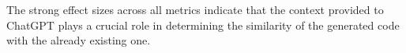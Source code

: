 



The strong effect sizes across all metrics indicate that the context provided to ChatGPT plays a crucial role in determining the similarity of the generated code with the already existing one. %

